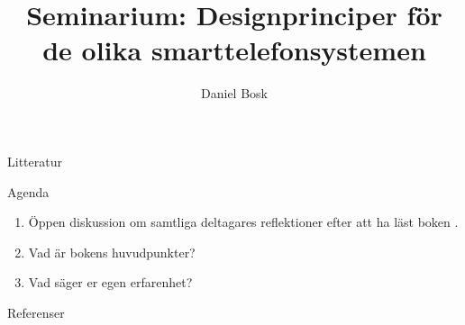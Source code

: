 \documentclass{beamer}
\title{%
  Seminarium: Designprinciper för de olika smarttelefonsystemen
}
\author{Daniel Bosk}
\institute[MIUN ITM]{%
  Avdelningen för informations- och kommunikationssytem (IKS),\\
  Mittuniversitetet, Sundsvall.
}
\date{\svnId}
\begin{document}
\begin{frame}
  \titlepage
\end{frame}

\begin{frame}{Litteratur}
  
\end{frame}





\begin{frame}{Agenda}
  \begin{enumerate}
    \item Öppen diskussion om samtliga deltagares reflektioner efter att ha 
      läst boken \cite{Nielsen2013mu}.

    \item Vad är bokens huvudpunkter?

    \item Vad säger er egen erfarenhet?

  \end{enumerate}
\end{frame}



\begin{frame}{Referenser}
	\small
  
\end{frame}
\end{document}
